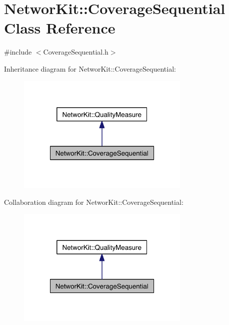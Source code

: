 \hypertarget{class_networ_kit_1_1_coverage_sequential}{\section{Networ\-Kit\-:\-:Coverage\-Sequential Class Reference}
\label{class_networ_kit_1_1_coverage_sequential}
}


{\ttfamily \#include $<$Coverage\-Sequential.\-h$>$}



Inheritance diagram for Networ\-Kit\-:\-:Coverage\-Sequential\-:\nopagebreak
\begin{figure}[H]
\begin{center}
\leavevmode
\includegraphics[width=234pt]{class_networ_kit_1_1_coverage_sequential__inherit__graph}
\end{center}
\end{figure}


Collaboration diagram for Networ\-Kit\-:\-:Coverage\-Sequential\-:\nopagebreak
\begin{figure}[H]
\begin{center}
\leavevmode
\includegraphics[width=234pt]{class_networ_kit_1_1_coverage_sequential__coll__graph}
\end{center}
\end{figure}
